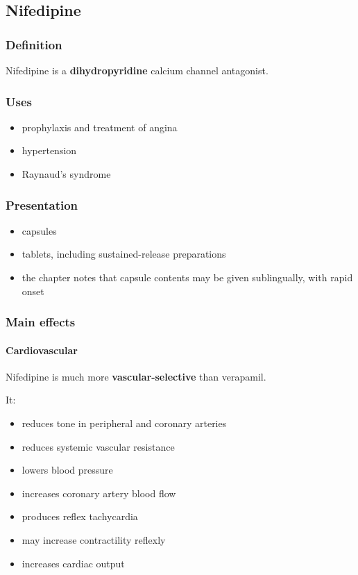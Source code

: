 \documentclass[11pt,a4paper]{article}
\begin{document}
\subsection{Nifedipine}

\subsubsection*{Definition}

Nifedipine is a \textbf{dihydropyridine} calcium channel antagonist.

\subsubsection*{Uses}
\begin{itemize}
    \item prophylaxis and treatment of angina
    \item hypertension
    \item Raynaud's syndrome
\end{itemize}

\subsubsection*{Presentation}
\begin{itemize}
    \item capsules
    \item tablets, including sustained-release preparations
    \item the chapter notes that capsule contents may be given sublingually, with rapid onset
\end{itemize}

\subsubsection*{Main effects}

\paragraph{Cardiovascular}
Nifedipine is much more \textbf{vascular-selective} than verapamil.

It:
\begin{itemize}
    \item reduces tone in peripheral and coronary arteries
    \item reduces systemic vascular resistance
    \item lowers blood pressure
    \item increases coronary artery blood flow
    \item produces reflex tachycardia
    \item may increase contractility reflexly
    \item increases cardiac output
\end{itemize}
\end{document}
